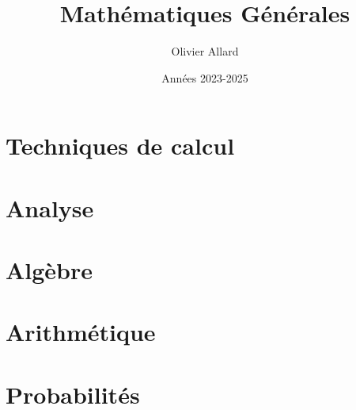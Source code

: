 \documentclass[12pt, a4paper, twoside]{report}
\author{Olivier Allard}
\title{Mathématiques Générales}
\date{Années 2023-2025}
\begin{document}


\tableofcontents

\part{Techniques de calcul}



\part{Analyse}






\part{Algèbre}





\part{Arithmétique}



\part{Probabilités}



\end{document}
